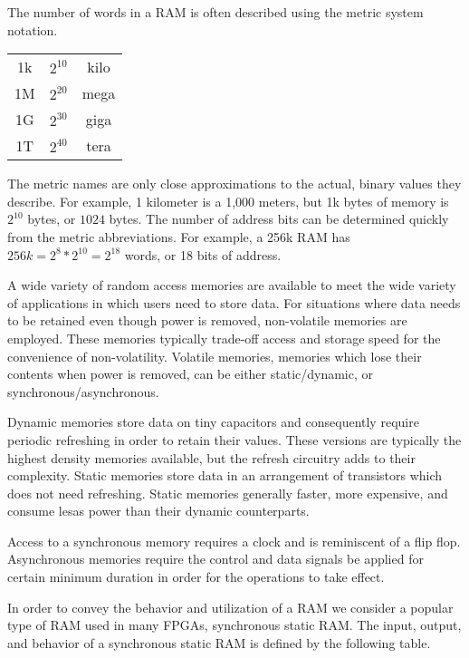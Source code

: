The number of words in a RAM is often described using the metric system notation.

\begin{tabular}{ccc}
1k & $2^{10}$ & kilo \\ 
1M & $2^{20}$ & mega \\ 
1G & $2^{30}$ & giga \\ 
1T & $2^{40}$ & tera \\ 
\end{tabular}

The metric names are only close approximations to the actual, binary values
they describe.  For example, 1 kilometer is a 1,000 meters, but 
1k bytes of memory is $2^{10}$ bytes, or $1024$ bytes.  The number of 
address bits can be determined quickly from the metric abbreviations.
For example, a 256k RAM has $256k=2^8*2^{10}=2^{18}$ words, or 18 bits 
of address.

A wide variety of random access memories are available to meet the wide
variety of applications in which users need to store data.  For situations where
data needs to be retained even though power is removed, non-volatile memories are employed.  
These memories typically trade-off access and storage speed for the 
convenience of non-volatility.  Volatile memories, memories which lose
their contents when power is removed, can be either static/dynamic, or 
synchronous/asynchronous.  

Dynamic memories store data on tiny capacitors and
consequently require periodic refreshing in order to retain their values.  These versions
are typically the highest density memories available, but the refresh circuitry
adds to their complexity.  Static memories store data in an arrangement
of transistors which does not need refreshing.  Static memories generally 
faster, more expensive, and consume lesas power than their dynamic counterparts.  

Access to a synchronous memory requires a clock and is reminiscent of a flip flop.
Asynchronous memories require the control and data signals be applied
for certain minimum duration in order for the operations to take effect.

In order to convey the behavior and utilization of a RAM we consider a popular
type of RAM used in many FPGAs, synchronous static RAM.
The input, output, and behavior of a synchronous static RAM is defined by the following table.


